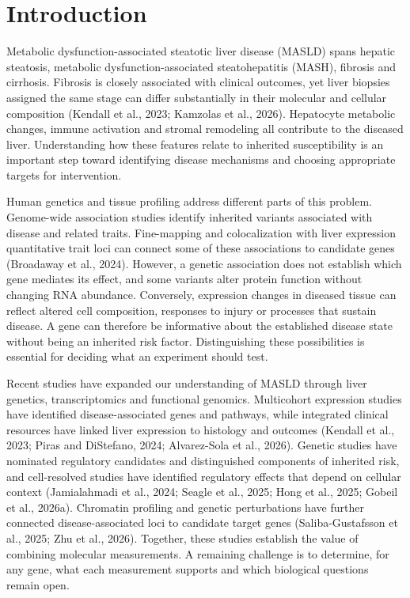 \section{Introduction}\label{introduction}

Metabolic dysfunction-associated steatotic liver disease (MASLD) spans hepatic steatosis, metabolic dysfunction-associated steatohepatitis (MASH), fibrosis and cirrhosis. Fibrosis is closely associated with clinical outcomes, yet liver biopsies assigned the same stage can differ substantially in their molecular and cellular composition (Kendall et al., 2023; Kamzolas et al., 2026). Hepatocyte metabolic changes, immune activation and stromal remodeling all contribute to the diseased liver. Understanding how these features relate to inherited susceptibility is an important step toward identifying disease mechanisms and choosing appropriate targets for intervention.

Human genetics and tissue profiling address different parts of this problem. Genome-wide association studies identify inherited variants associated with disease and related traits. Fine-mapping and colocalization with liver expression quantitative trait loci can connect some of these associations to candidate genes (Broadaway et al., 2024). However, a genetic association does not establish which gene mediates its effect, and some variants alter protein function without changing RNA abundance. Conversely, expression changes in diseased tissue can reflect altered cell composition, responses to injury or processes that sustain disease. A gene can therefore be informative about the established disease state without being an inherited risk factor. Distinguishing these possibilities is essential for deciding what an experiment should test.

Recent studies have expanded our understanding of MASLD through liver genetics, transcriptomics and functional genomics. Multicohort expression studies have identified disease-associated genes and pathways, while integrated clinical resources have linked liver expression to histology and outcomes (Kendall et al., 2023; Piras and DiStefano, 2024; Alvarez-Sola et al., 2026). Genetic studies have nominated regulatory candidates and distinguished components of inherited risk, and cell-resolved studies have identified regulatory effects that depend on cellular context (Jamialahmadi et al., 2024; Seagle et al., 2025; Hong et al., 2025; Gobeil et al., 2026a). Chromatin profiling and genetic perturbations have further connected disease-associated loci to candidate target genes (Saliba-Gustafsson et al., 2025; Zhu et al., 2026). Together, these studies establish the value of combining molecular measurements. A remaining challenge is to determine, for any gene, what each measurement supports and which biological questions remain open.

